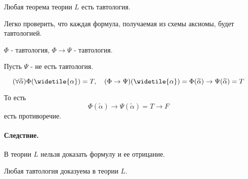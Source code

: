 \begin{theorem}
Любая теорема теории $L$ есть тавтология.
\end{theorem}
\begin{myproof}
Легко проверить, что каждая формула, получаемая из схемы аксиомы, будет тавтологией.

$\Phi$ - тавтология,  $\Phi \to \Psi$ - тавтология.

Пусть $\Psi$ - не есть тавтология.

 \[
     (\forall \widetilde{\alpha})\Phi(\widetile{\alpha}) = T,\quad 
     (\Phi \to \Psi)(\widetile{\alpha}) = \Phi(\widetilde{\alpha}) \to \Psi(\widetilde{\alpha}) = T
\] 

То есть
 \[
     \Phi(\widetilde{\alpha}) \to \Psi(\widetilde{\alpha}) = T \to F
\]
есть противоречие.
\end{myproof}

\paragraph*{Следствие.}
В теории $L$ нельзя доказать формулу и ее отрицание.


\begin{theorem}
Любая тавтология доказуема в теории $L$.
\end{theorem}

